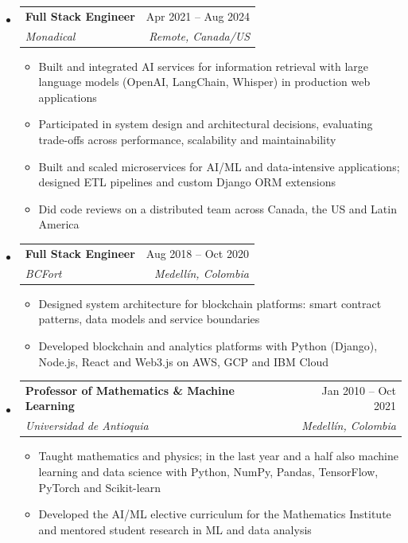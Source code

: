 \documentclass[letterpaper,10pt]{article}
\makeatletter
\newcommand{\resumeSubheading}[4]{
  \vspace{-2pt}
  \item[]
  \begin{tabular*}{\textwidth}{@{\extracolsep{\fill}}l r}
    \textbf{#1} & #2 \\
    \textit{#3} & \textit{#4} \\
  \end{tabular*}
  \vspace{-5pt}
}
\makeatother
\begin{document}
\begin{itemize}[leftmargin=0pt, itemindent=0pt, label={}, itemsep=1pt]
\begin{itemize}[leftmargin=*, itemsep=0pt]
\end{itemize}
\resumeSubheading
{Full Stack Engineer}{Apr 2021 -- Aug 2024}
{Monadical}{Remote, Canada/US}
\begin{itemize}[leftmargin=*, itemsep=0pt]
    \item Built and integrated AI services for information retrieval with large language models (OpenAI, LangChain, Whisper) in production web applications
    \item Participated in system design and architectural decisions, evaluating trade-offs across performance, scalability and maintainability
    \item Built and scaled microservices for AI/ML and data-intensive applications; designed ETL pipelines and custom Django ORM extensions
    \item Did code reviews on a distributed team across Canada, the US and Latin America
\end{itemize}
\resumeSubheading
{Full Stack Engineer}{Aug 2018 -- Oct 2020}
{BCFort}{Medell\'in, Colombia}
\begin{itemize}[leftmargin=*, itemsep=0pt]
    \item Designed system architecture for blockchain platforms: smart contract patterns, data models and service boundaries
    \item Developed blockchain and analytics platforms with Python (Django), Node.js, React and Web3.js on AWS, GCP and IBM Cloud
\end{itemize}
\resumeSubheading
{Professor of Mathematics \& Machine Learning}{Jan 2010 -- Oct 2021}
{Universidad de Antioquia}{Medell\'in, Colombia}
\begin{itemize}[leftmargin=*, itemsep=0pt]
    \item Taught mathematics and physics; in the last year and a half also machine learning and data science with Python, NumPy, Pandas, TensorFlow, PyTorch and Scikit-learn
    \item Developed the AI/ML elective curriculum for the Mathematics Institute and mentored student research in ML and data analysis
\end{itemize}
\end{itemize}
\end{document}
